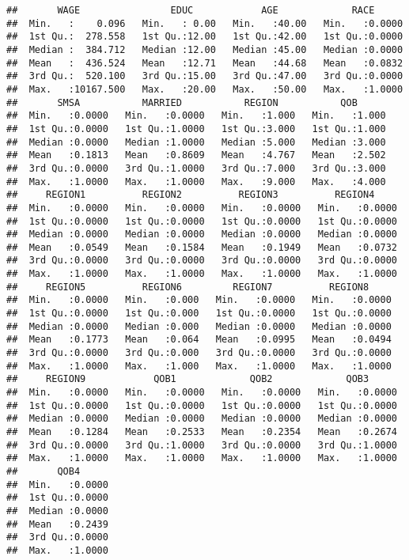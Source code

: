 \documentclass[
]{article}
\begin{document}
\begin{verbatim}
##       WAGE                EDUC            AGE             RACE       
##  Min.   :    0.096   Min.   : 0.00   Min.   :40.00   Min.   :0.0000  
##  1st Qu.:  278.558   1st Qu.:12.00   1st Qu.:42.00   1st Qu.:0.0000  
##  Median :  384.712   Median :12.00   Median :45.00   Median :0.0000  
##  Mean   :  436.524   Mean   :12.71   Mean   :44.68   Mean   :0.0832  
##  3rd Qu.:  520.100   3rd Qu.:15.00   3rd Qu.:47.00   3rd Qu.:0.0000  
##  Max.   :10167.500   Max.   :20.00   Max.   :50.00   Max.   :1.0000  
##       SMSA           MARRIED           REGION           QOB       
##  Min.   :0.0000   Min.   :0.0000   Min.   :1.000   Min.   :1.000  
##  1st Qu.:0.0000   1st Qu.:1.0000   1st Qu.:3.000   1st Qu.:1.000  
##  Median :0.0000   Median :1.0000   Median :5.000   Median :3.000  
##  Mean   :0.1813   Mean   :0.8609   Mean   :4.767   Mean   :2.502  
##  3rd Qu.:0.0000   3rd Qu.:1.0000   3rd Qu.:7.000   3rd Qu.:3.000  
##  Max.   :1.0000   Max.   :1.0000   Max.   :9.000   Max.   :4.000  
##     REGION1          REGION2          REGION3          REGION4      
##  Min.   :0.0000   Min.   :0.0000   Min.   :0.0000   Min.   :0.0000  
##  1st Qu.:0.0000   1st Qu.:0.0000   1st Qu.:0.0000   1st Qu.:0.0000  
##  Median :0.0000   Median :0.0000   Median :0.0000   Median :0.0000  
##  Mean   :0.0549   Mean   :0.1584   Mean   :0.1949   Mean   :0.0732  
##  3rd Qu.:0.0000   3rd Qu.:0.0000   3rd Qu.:0.0000   3rd Qu.:0.0000  
##  Max.   :1.0000   Max.   :1.0000   Max.   :1.0000   Max.   :1.0000  
##     REGION5          REGION6         REGION7          REGION8      
##  Min.   :0.0000   Min.   :0.000   Min.   :0.0000   Min.   :0.0000  
##  1st Qu.:0.0000   1st Qu.:0.000   1st Qu.:0.0000   1st Qu.:0.0000  
##  Median :0.0000   Median :0.000   Median :0.0000   Median :0.0000  
##  Mean   :0.1773   Mean   :0.064   Mean   :0.0995   Mean   :0.0494  
##  3rd Qu.:0.0000   3rd Qu.:0.000   3rd Qu.:0.0000   3rd Qu.:0.0000  
##  Max.   :1.0000   Max.   :1.000   Max.   :1.0000   Max.   :1.0000  
##     REGION9            QOB1             QOB2             QOB3       
##  Min.   :0.0000   Min.   :0.0000   Min.   :0.0000   Min.   :0.0000  
##  1st Qu.:0.0000   1st Qu.:0.0000   1st Qu.:0.0000   1st Qu.:0.0000  
##  Median :0.0000   Median :0.0000   Median :0.0000   Median :0.0000  
##  Mean   :0.1284   Mean   :0.2533   Mean   :0.2354   Mean   :0.2674  
##  3rd Qu.:0.0000   3rd Qu.:1.0000   3rd Qu.:0.0000   3rd Qu.:1.0000  
##  Max.   :1.0000   Max.   :1.0000   Max.   :1.0000   Max.   :1.0000  
##       QOB4       
##  Min.   :0.0000  
##  1st Qu.:0.0000  
##  Median :0.0000  
##  Mean   :0.2439  
##  3rd Qu.:0.0000  
##  Max.   :1.0000
\end{verbatim}
\end{document}
